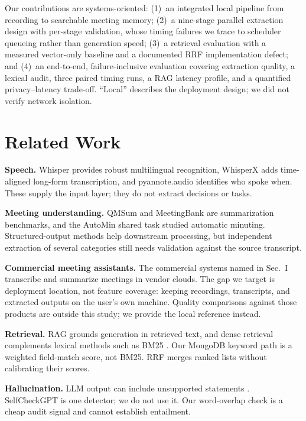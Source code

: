 \documentclass[conference]{IEEEtran}
\begin{document}
Our contributions are systems-oriented: (1)~an integrated local pipeline from recording to searchable meeting memory; (2)~a nine-stage parallel extraction design with per-stage validation, whose timing failures we trace to scheduler queueing rather than generation speed; (3)~a retrieval evaluation with a measured vector-only baseline and a documented RRF implementation defect; and (4)~an end-to-end, failure-inclusive evaluation covering extraction quality, a lexical audit, three paired timing runs, a RAG latency profile, and a quantified privacy--latency trade-off. ``Local'' describes the deployment design; we did not verify network isolation.

\section{Related Work}
\textbf{Speech.} Whisper \cite{whisper} provides robust multilingual recognition, WhisperX \cite{whisperx} adds time-aligned long-form transcription, and pyannote.audio \cite{pyannote} identifies who spoke when. These supply the input layer; they do not extract decisions or tasks.

\textbf{Meeting understanding.} QMSum \cite{qmsum} and MeetingBank \cite{meetingbank} are summarization benchmarks, and the AutoMin shared task \cite{automin} studied automatic minuting. Structured-output methods \cite{structured} help downstream processing, but independent extraction of several categories still needs validation against the source transcript.

\textbf{Commercial meeting assistants.} The commercial systems named in Sec.~I transcribe and summarize meetings in vendor clouds. The gap we target is deployment location, not feature coverage: keeping recordings, transcripts, and extracted outputs on the user's own machine. Quality comparisons against those products are outside this study; we provide the local reference instead.

\textbf{Retrieval.} RAG \cite{rag} grounds generation in retrieved text, and dense retrieval \cite{dpr} complements lexical methods such as BM25 \cite{bm25}. Our MongoDB keyword path is a weighted field-match score, not BM25. RRF \cite{rrf} merges ranked lists without calibrating their scores.

\textbf{Hallucination.} LLM output can include unsupported statements \cite{halluc}. SelfCheckGPT \cite{selfcheck} is one detector; we do not use it. Our word-overlap check is a cheap audit signal and cannot establish entailment.
\end{document}
